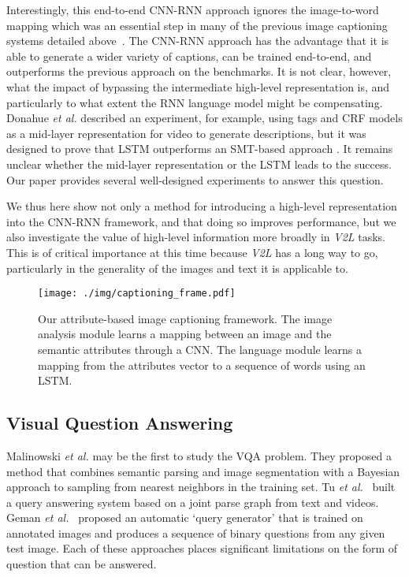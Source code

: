 \documentclass[10pt,journal,compsoc]{IEEEtran}
\newcommand{\etal}{\emph{et al.}}
\def\V2L{\textit{V2L}}
\begin{document}
Interestingly, this end-to-end CNN-RNN approach ignores the image-to-word mapping which was an essential step in many of the previous image captioning systems detailed above~\cite{farhadi2010every,kulkarni2013babytalk,li2011composing,yang2011corpus}. The CNN-RNN approach has the advantage that it is able to generate a wider variety of captions, can be trained end-to-end, and outperforms the previous approach on the benchmarks. It is not clear, however, what the impact of bypassing the intermediate high-level representation is, and particularly to what extent the RNN language model might be compensating. Donahue \etal \cite{donahue2014long} described an experiment, for example, using tags and CRF models as a mid-layer representation for video to generate descriptions, but it was designed to prove that LSTM outperforms an SMT-based approach \cite{rohrbach2013translating}. It remains unclear whether the mid-layer representation or the LSTM leads to the success. Our paper provides several well-designed experiments to answer this question.

We thus here show not only a method for introducing a high-level representation into the CNN-RNN framework, and that doing so improves performance, but we also investigate the value of high-level information more broadly in \V2L tasks.  This is of critical importance at this time because \V2L has a long way to go, particularly in the generality of the images and text it is applicable to.

\begin{figure*}[t!]
  \centering
  \texttt{[image: ./img/captioning\_frame.pdf]}\\
  \vspace{-5pt}
  \caption{Our attribute-based image captioning framework. The image analysis module learns a mapping between an image and the semantic attributes through a CNN. The language module learns a mapping from the attributes vector to a sequence of words using an LSTM. }
  \label{img:cap_frame}
  \vspace{-5pt}
\end{figure*}

\subsection{Visual Question Answering} Malinowski \etal \cite{malinowski2014multi}
may be the first to study the VQA problem. They proposed a method that combines semantic parsing and image segmentation with a Bayesian approach to sampling from nearest neighbors in the training set. Tu \etal~\cite{tu2014joint} built a query answering system based on a joint parse graph from text and videos. Geman \etal~\cite{geman2015visual} proposed an automatic `query generator' that is trained on annotated images and produces a sequence of binary questions from any given test image. Each of these approaches places significant limitations on the form of question that can be answered.
\end{document}
